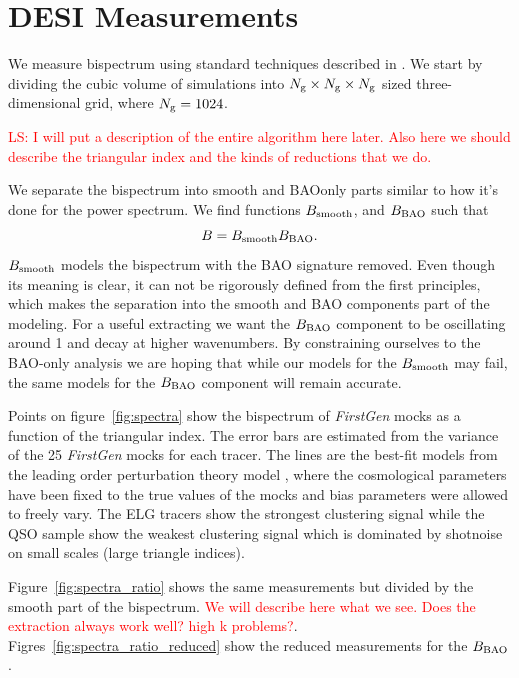 \section{DESI Measurements}\label{sec:measurements}

We measure bispectrum using standard techniques described in \cite{}. We start by dividing the cubic volume of simulations into $N_\mathrm{g} \times N_\mathrm{g}\times N_\mathrm{g}$ sized three-dimensional grid, where $N_\mathrm{g} = 1024$.

\textcolor{red}{LS: I will put a description of the entire algorithm here later. Also here we should describe the triangular index and the kinds of reductions that we do.}

We separate the bispectrum into smooth and BAOonly parts similar to how it's done for the power spectrum. We find functions $B_\mathrm{smooth}$, and $B_\mathrm{BAO}$ such that
\begin{equation}
    B = B_\mathrm{smooth}B_\mathrm{BAO}.
\end{equation}
$B_\mathrm{smooth}$ models the bispectrum with the BAO signature removed. Even though its meaning is clear, it can not be rigorously defined from the first principles, which makes the separation into the smooth and BAO components part of the modeling. For a useful extracting we want the $B_\mathrm{BAO}$ component to be oscillating around 1 and decay at higher wavenumbers. By constraining ourselves to the BAO-only analysis we are hoping that while our models for the $B_\mathrm{smooth}$ may fail, the same models for the $B_\mathrm{BAO}$ component will remain accurate.


Points on figure~\ref{fig:spectra} show the bispectrum of \textit{FirstGen} mocks as a function of the triangular index. The error bars are estimated from the variance of the 25 \textit{FirstGen} mocks for each tracer. The lines are the best-fit models from the leading order perturbation theory model , where the cosmological parameters have been fixed to the true values of the mocks and bias parameters were allowed to freely vary. The ELG tracers show the strongest clustering signal while the QSO sample show the weakest clustering signal which is dominated by shotnoise on small scales (large triangle indices). 

Figure~\ref{fig:spectra_ratio} shows the same measurements but divided by the smooth part of the bispectrum. \textcolor{red}{We will describe here what we see. Does the extraction always work well? high k problems?}. Figres~\ref{fig:spectra_ratio_reduced} show the reduced measurements for the $B_\mathrm{BAO}$.

